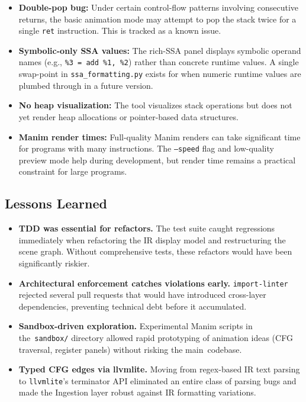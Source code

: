 \begin{itemize}
    \item \textbf{Double-pop bug:} Under certain control-flow patterns involving consecutive returns, the basic animation mode may attempt to pop the stack twice for a single \texttt{ret} instruction. This is tracked as a known issue.

    \item \textbf{Symbolic-only SSA values:} The rich-SSA panel displays symbolic operand names (e.g., \texttt{\%3 = add \%1, \%2}) rather than concrete runtime values. A single swap-point in \texttt{ssa\_formatting.py} exists for when numeric runtime values are plumbed through in a future version.

    \item \textbf{No heap visualization:} The tool visualizes stack operations but does not yet render heap allocations or pointer-based data structures.

    \item \textbf{Manim render times:} Full-quality Manim renders can take significant time for programs with many instructions. The \texttt{--speed} flag and low-quality preview mode help during development, but render time remains a practical constraint for large programs.
\end{itemize}

\subsection{Lessons Learned}
\begin{itemize}
    \item \textbf{TDD was essential for refactors.} The test suite caught regressions immediately when refactoring the IR display model and restructuring the scene graph. Without comprehensive tests, these refactors would have been significantly riskier.

    \item \textbf{Architectural enforcement catches violations early.} \texttt{import-linter} rejected several pull requests that would have introduced cross-layer dependencies, preventing technical debt before it accumulated.

    \item \textbf{Sandbox-driven exploration.} Experimental Manim scripts in the~\texttt{sandbox/} directory allowed rapid prototyping of animation ideas (CFG traversal, register panels) without risking the main~codebase.

    \item \textbf{Typed CFG edges via llvmlite.} Moving from regex-based IR text parsing to \texttt{llvmlite}'s terminator API eliminated an entire class of parsing bugs and made the Ingestion layer robust against IR formatting variations.
\end{itemize}
